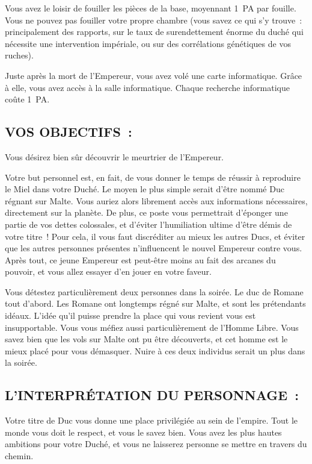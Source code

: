 \documentclass[14pt,twocolumn]{extarticle}
\begin{document}
Vous avez le loisir de fouiller les pièces de la base, moyennant 1~PA par
fouille. Vous ne pouvez pas fouiller votre propre chambre (vous savez ce qui
s’y trouve~: principalement des rapports, sur le taux de surendettement énorme
du duché qui nécessite une intervention impériale, ou sur des corrélations
génétiques de vos ruches).

Juste après la mort de l’Empereur, vous avez volé une carte informatique.
Grâce à elle, vous avez accès à la salle informatique. Chaque recherche
informatique coûte 1~PA.

\subsection{VOS OBJECTIFS~:}

Vous désirez bien sûr découvrir le meurtrier de l’Empereur.

Votre but personnel est, en fait, de vous donner le temps de réussir à
reproduire le Miel dans votre Duché. Le moyen le plus simple serait d’être
nommé Duc régnant sur Malte. Vous auriez alors librement accès aux informations
nécessaires, directement sur la planète. De plus, ce poste vous permettrait
d’éponger une partie de vos dettes colossales, et d’éviter l’humiliation ultime
d’être démis de votre titre~! Pour cela, il vous faut discréditer au mieux les
autres Ducs, et éviter que les autres personnes présentes n’influencent le
nouvel Empereur contre vous.  Après tout, ce jeune Empereur est peut-être moins
au fait des arcanes du pouvoir, et vous allez essayer d’en jouer en votre
faveur.

Vous détestez particulièrement deux personnes dans la soirée. Le duc de Romane
tout d’abord. Les Romane ont longtemps régné sur Malte, et sont les prétendants
idéaux. L’idée qu’il puisse prendre la place qui vous revient vous est
insupportable. Vous vous méfiez aussi particulièrement de l’Homme Libre. Vous
savez bien que les vols sur Malte ont pu être découverts, et cet homme est le
mieux placé pour vous démasquer. Nuire à ces deux individus serait un plus dans
la soirée.

\subsection{L'INTERPRÉTATION DU PERSONNAGE~:}

Votre titre de Duc vous donne une place privilégiée au sein de l’empire. Tout
le monde vous doit le respect, et vous le savez bien. Vous avez les plus hautes
ambitions pour votre Duché, et vous ne laisserez personne se mettre en travers
du chemin.
\end{document}
